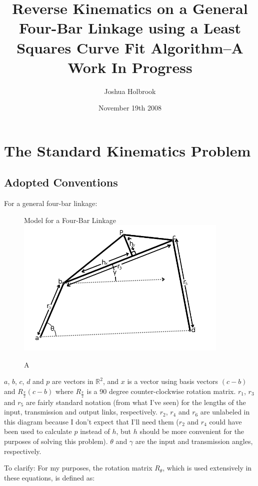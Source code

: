 \documentclass[12pt, letterpaper]{article}
\begin{document}
\title{Reverse Kinematics on a General Four-Bar Linkage using a Least Squares Curve Fit Algorithm--A Work In Progress}
\author{Joshua Holbrook}
\date{November 19th 2008}
\maketitle

\section*{The Standard Kinematics Problem}
\subsection*{Adopted Conventions}
For a general four-bar linkage:

\begin{figure}[H]
\caption A Model for a Four-Bar Linkage
\centering
\includegraphics[width=4in]{fourbar}
\label{fig:fourbar}
\end{figure}

\(a\), \(b\), \(c\), \(d\) and \(p\) are vectors in \(\mathbb{R}^2\), and \(x\) is a vector using basis vectors \(\left(c-b\right)\) and \(R_{\frac{\pi}2}\left(c-b\right)\) where \(R_{\frac{\pi}2}\) is a 90 degree counter-clockwise rotation matrix. \(r_1\), \(r_3\) and \(r_5\) are fairly standard notation (from what I've seen) for the lengths of the input, transmission and output links, respectively. \(r_2\), \(r_4\) and \(r_6\) are unlabeled in this diagram because I don't expect that I'll need them (\(r_2\) and \(r_4\) could have been used to calculate \(p\) instead of \(h\), but \(h\) should be more convenient for the purposes of solving this problem). \(\theta\) and \(\gamma\) are the input and transmission angles, respectively.

To clarify: For my purposes, the rotation matrix \(R_{\theta}\), which is used extensively in these equations, is defined as:
\end{document}
